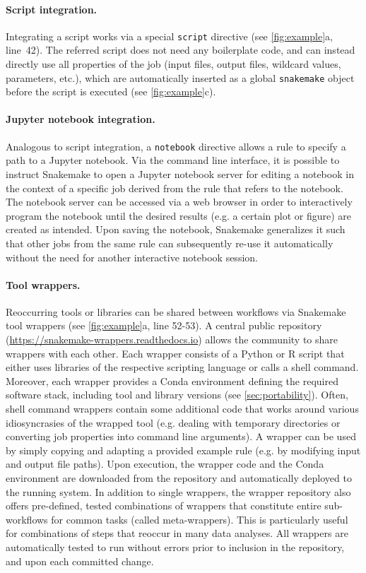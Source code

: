 \documentclass[parskip=half, DIV=18]{scrartcl}
\let\plainurl\url
\renewcommand{\url}[1]{\protect\plainurl{#1}}
\begin{document}
\paragraph{Script integration.}
Integrating a script works via a special \lstinline!script! directive (see \autoref{fig:example}a, line~42).
The referred script does not need any boilerplate code, and can instead directly use all properties of the job (input files, output files, wildcard values, parameters, etc.), which are automatically inserted as a global \lstinline!snakemake! object before the script is executed (see \autoref{fig:example}c).

\paragraph{Jupyter notebook integration.}
Analogous to script integration, a \lstinline!notebook! directive allows a rule to specify a path to a Jupyter notebook.
Via the command line interface, it is possible to instruct Snakemake to open a Jupyter notebook server for editing a notebook in the context of a specific job derived from the rule that refers to the notebook.
The notebook server can be accessed via a web browser in order to interactively program the notebook until the desired results (e.g. a certain plot or figure) are created as intended.
Upon saving the notebook, Snakemake generalizes it such that other jobs from the same rule can subsequently re-use it automatically without the need for another interactive notebook session.

\paragraph{Tool wrappers.}
Reoccurring tools or libraries can be shared between workflows via Snakemake tool wrappers (see \autoref{fig:example}a, line 52-53).
A central public repository (\url{https://snakemake-wrappers.readthedocs.io}) allows the community to share wrappers with each other.
Each wrapper consists of a Python or R script that either uses libraries of the respective scripting language or calls a shell command.
Moreover, each wrapper provides a Conda environment defining the required software stack, including tool and library versions (see \autoref{sec:portability}).
Often, shell command wrappers contain some additional code that works around various idiosyncrasies of the wrapped tool (e.g. dealing with temporary directories or converting job properties into command line arguments).
A wrapper can be used by simply copying and adapting a provided example rule (e.g. by modifying input and output file paths).
Upon execution, the wrapper code and the Conda environment are downloaded from the repository and automatically deployed to the running system.
In addition to single wrappers, the wrapper repository also offers pre-defined, tested combinations of wrappers that constitute entire sub-workflows for common tasks (called meta-wrappers).
This is particularly useful for combinations of steps that reoccur in many data analyses.
All wrappers are automatically tested to run without errors prior to inclusion in the repository, and upon each committed change.
\end{document}
